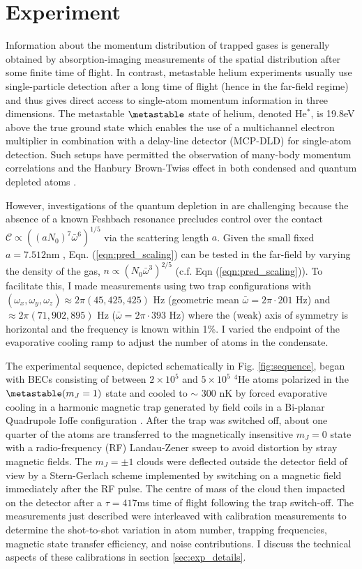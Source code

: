 \section{Experiment} 
	Information about the momentum distribution of trapped gases is generally obtained by absorption-imaging measurements of the spatial distribution after some finite time of flight. In contrast, metastable helium experiments usually use single-particle detection after a long time of flight (hence in the far-field regime) and thus gives direct access to  single-atom momentum information in three dimensions. The metastable $\metastable$ state of helium, denoted He$^*$, is 19.8eV above the true ground state \cite{Hodgman09} which enables the use of a multichannel electron multiplier in combination with a delay-line detector (MCP-DLD) \cite{Manning10} for single-atom detection. Such setups have permitted the observation of many-body momentum correlations \cite{Hodgman11,Dall13} and the Hanbury Brown-Twiss effect in both condensed \cite{Schellekens05,Jeltes07,Manning10,Dall11,Perrin07,Perrin12} and quantum depleted atoms \cite{Cayla20}. 
	
	However, investigations of the quantum depletion in \mhe are challenging because the absence of a known Feshbach resonance precludes control over the contact $\mathcal{C}\propto((a N_0)^7\bar{\omega}^6)^{1/5}$ via the scattering length $a$. 
	Given the small fixed $a=7.512$nm \cite{Moal06}, Eqn. (\ref{eqn:pred_scaling}) can be tested in the far-field by varying the density of the gas, $n\propto\left(N_{0}\bar{\omega}^3\right)^{2/5}$ (c.f. Eqn (\ref{eqn:pred_scaling})). 
	To facilitate this, I made measurements using two trap configurations with $(\omega_x,\omega_y,\omega_z)\approx 2\pi(45,425,425)$ Hz (geometric mean $\bar{\omega} = 2\pi \cdot201$ Hz) and 
	$\approx2\pi (71,902,895)$ Hz ($\bar{\omega} = 2\pi \cdot393$ Hz) where the (weak) axis of symmetry is horizontal and the frequency is known within 1\%.
	I varied the endpoint of the evaporative cooling ramp to adjust the number of atoms in the condensate. 
	
	The experimental sequence, depicted schematically in Fig. \ref{fig:sequence}, began with BECs consisting of between $2\times 10^5$ and $5\times 10^5$ $^4$He atoms polarized in the $\metastable(m_J=1)$ state and cooled to $\sim$ 300 nK by forced evaporative cooling in a harmonic magnetic trap generated by field coils in a Bi-planar Quadrupole Ioffe configuration \cite{Dall07}. 
	After the trap was switched off,  about one quarter of the atoms are transferred to the magnetically insensitive $m_J=0$ state with a radio-frequency (RF) Landau-Zener sweep to avoid distortion by stray magnetic fields.
	The $m_J=\pm 1$ clouds were deflected outside the detector field of view by a Stern-Gerlach scheme implemented by switching on a magnetic field immediately after the RF pulse.
	The centre of mass of the cloud then impacted on the detector after a $\tau = 417$ms time of flight following the trap switch-off. 
	The measurements just described were interleaved with calibration measurements to determine the shot-to-shot variation in atom number, trapping frequencies, magnetic state transfer efficiency, and noise contributions. I discuss the technical aspects of these calibrations  in section \ref{sec:exp_details}.

